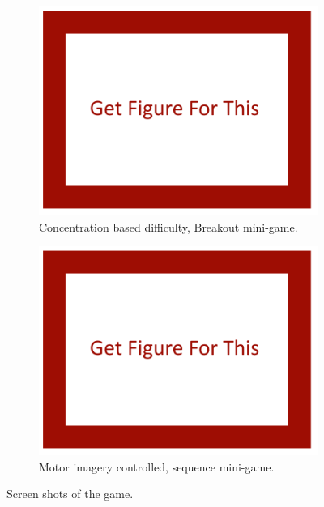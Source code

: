 \documentclass[11pt, a4paper]{article}
\begin{document}
\begin{figure}[H]
	\centering
	\begin{subfigure}[t]{0.45\linewidth}
		\includegraphics[width = \linewidth] {[ Figures ]/Get Figure.png}
		\caption{Concentration based difficulty, Breakout mini-game.}
		\label{fig:the_game_1}
	\end{subfigure}
	\begin{subfigure}[t]{0.45\linewidth}
		\includegraphics[width = \linewidth] {[ Figures ]/Get Figure.png}
		\caption{Motor imagery controlled, sequence mini-game.}
		\label{fig:the_game_2}
	\end{subfigure}
	\caption{Screen shots of the game.}
	\label{fig:the_game}
\end{figure}
\end{document}
